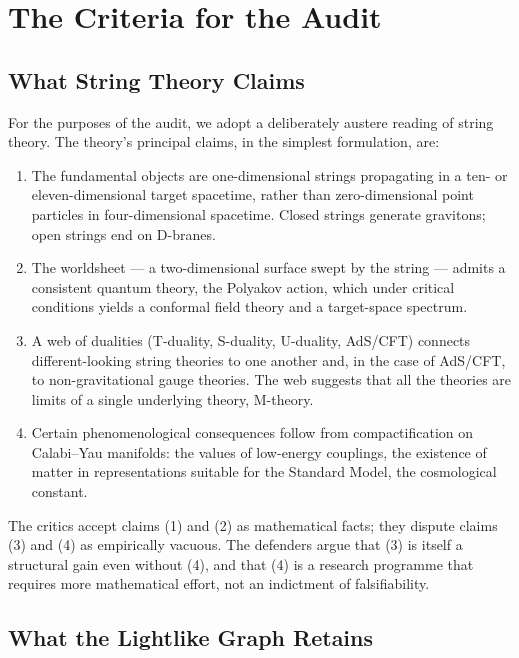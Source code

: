 \documentclass[11pt]{article}
\begin{document}
\section{The Criteria for the Audit}

\subsection{What String Theory Claims}

For the purposes of the audit, we adopt a deliberately austere reading of string theory. The theory's principal claims, in the simplest formulation, are:
\begin{enumerate}
    \item The fundamental objects are one-dimensional strings propagating in a ten- or eleven-dimensional target spacetime, rather than zero-dimensional point particles in four-dimensional spacetime. Closed strings generate gravitons; open strings end on D-branes.
    \item The worldsheet --- a two-dimensional surface swept by the string --- admits a consistent quantum theory, the Polyakov action, which under critical conditions yields a conformal field theory and a target-space spectrum.
    \item A web of dualities (T-duality, S-duality, U-duality, AdS/CFT) connects different-looking string theories to one another and, in the case of AdS/CFT, to non-gravitational gauge theories. The web suggests that all the theories are limits of a single underlying theory, M-theory.
    \item Certain phenomenological consequences follow from compactification on Calabi--Yau manifolds: the values of low-energy couplings, the existence of matter in representations suitable for the Standard Model, the cosmological constant.
\end{enumerate}
The critics accept claims (1) and (2) as mathematical facts; they dispute claims (3) and (4) as empirically vacuous. The defenders argue that (3) is itself a structural gain even without (4), and that (4) is a research programme that requires more mathematical effort, not an indictment of falsifiability.

\subsection{What the Lightlike Graph Retains}
\end{document}
